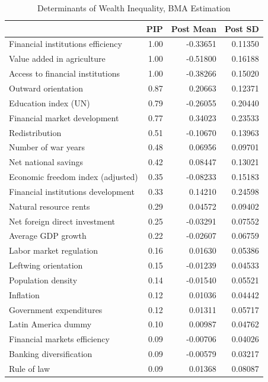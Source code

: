 \documentclass[a4paper,11pt]{article}
\begin{document}
\begin{table}[!ht]
\footnotesize
\centering
\caption{Determinants of Wealth Inequality, BMA Estimation}
\label{table:res1}
\begin{threeparttable}
\begin{tabular}{lrrr}
  \toprule
 & PIP & Post Mean & Post SD \\ 
    \midrule
  Financial institutions efficiency & 1.00 & -0.33651 & 0.11350 \\ 
  Value added in agriculture & 1.00 & -0.51800 & 0.16188 \\ 
  Access to financial institutions & 1.00 & -0.38266 & 0.15020 \\ 
  Outward orientation & 0.87 & 0.20663 & 0.12371 \\ 
  Education index (UN) & 0.79 & -0.26055 & 0.20440 \\ 
  Financial market development & 0.77 & 0.34023 & 0.23533 \\ 
  Redistribution & 0.51 & -0.10670 & 0.13963 \\ 
  Number of war years & 0.48 & 0.06956 & 0.09701 \\ 
  Net national savings & 0.42 & 0.08447 & 0.13021 \\ 
  Economic freedom index (adjusted) & 0.35 & -0.08233 & 0.15183 \\ 
  Financial institutions development & 0.33 & 0.14210 & 0.24598 \\ 
  Natural resource rents & 0.29 & 0.04572 & 0.09402 \\ 
  Net foreign direct investment & 0.25 & -0.03291 & 0.07552 \\ 
  Average GDP growth & 0.22 & -0.02607 & 0.06759 \\ 
  Labor market regulation & 0.16 & 0.01630 & 0.05386 \\ 
  Leftwing orientation & 0.15 & -0.01239 & 0.04533 \\ 
  Population density & 0.14 & -0.01540 & 0.05521 \\ 
  Inflation & 0.12 & 0.01036 & 0.04442 \\ 
  Government expenditures & 0.12 & 0.01311 & 0.05717 \\ 
  Latin America dummy & 0.10 & 0.00987 & 0.04762 \\ 
  Financial markets efficiency & 0.09 & -0.00706 & 0.04026 \\ 
  Banking diversification & 0.09 & -0.00579 & 0.03217 \\ 
  Rule of law & 0.09 & 0.01368 & 0.08087 \\ 

\end{tabular}
\end{threeparttable}
\end{table}
\end{document}
